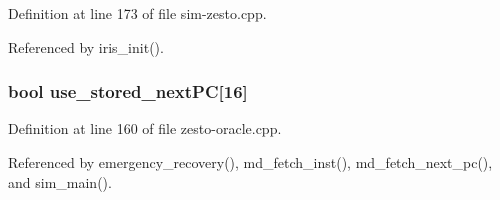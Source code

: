 Definition at line 173 of file sim-zesto.cpp.

Referenced by iris\_\-init().
\subsubsection[{use\_\-stored\_\-nextPC}]{\setlength{\rightskip}{0pt plus 5cm}bool {\bf use\_\-stored\_\-nextPC}[16]}\label{sim-zesto_8cpp_38a36f4cd3940833135cd0c497f726f4}




Definition at line 160 of file zesto-oracle.cpp.

Referenced by emergency\_\-recovery(), md\_\-fetch\_\-inst(), md\_\-fetch\_\-next\_\-pc(), and sim\_\-main().